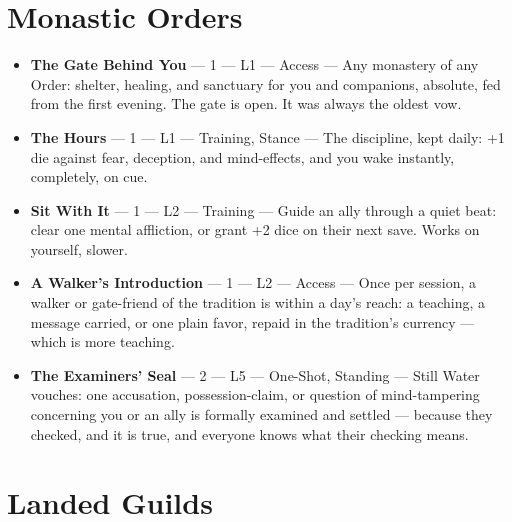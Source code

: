 \section{Monastic Orders}

\begin{itemize}
    \item \textbf{The Gate Behind You} --- 1 --- L1 --- Access --- Any monastery of any Order: shelter, healing, and sanctuary for you and companions, absolute, fed from the first evening. The gate is open. It was always the oldest vow.
    \item \textbf{The Hours} --- 1 --- L1 --- Training, Stance --- The discipline, kept daily: +1 die against fear, deception, and mind-effects, and you wake instantly, completely, on cue.
    \item \textbf{Sit With It} --- 1 --- L2 --- Training --- Guide an ally through a quiet beat: clear one mental affliction, or grant +2 dice on their next save. Works on yourself, slower.
    \item \textbf{A Walker's Introduction} --- 1 --- L2 --- Access --- Once per session, a walker or gate-friend of the tradition is within a day's reach: a teaching, a message carried, or one plain favor, repaid in the tradition's currency --- which is more teaching.
    \item \textbf{The Examiners' Seal} --- 2 --- L5 --- One-Shot, Standing --- Still Water vouches: one accusation, possession-claim, or question of mind-tampering concerning you or an ally is formally examined and settled --- because they checked, and it is true, and everyone knows what their checking means.
\end{itemize}

\section{Landed Guilds}

